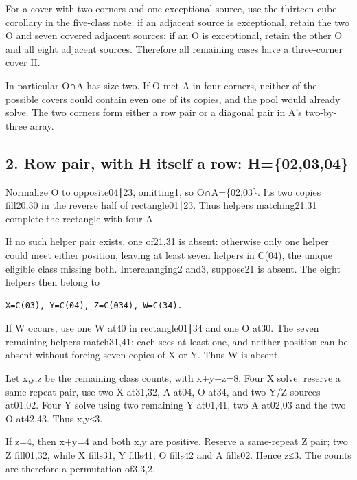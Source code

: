 \documentclass[
  10pt,
]{article}
\begin{document}
For a cover with two corners and one exceptional source, use the
thirteen-cube corollary in the five-class note: if an adjacent source is
exceptional, retain the two O and seven covered adjacent sources; if an
O is exceptional, retain the other O and all eight adjacent sources.
Therefore all remaining cases have a three-corner cover H.

In particular O∩A has size two. If O met A in four corners, neither of
the possible covers could contain even one of its copies, and the pool
would already solve. The two corners form either a row pair or a
diagonal pair in A's two-by-three array.

\hypertarget{row-pair-with-h-itself-a-row-h020304}{%
\subsection*{2. Row pair, with H itself a row:
H=\{02,03,04\}}\label{row-pair-with-h-itself-a-row-h020304}}

Normalize O to opposite04∣23, omitting1, so O∩A=\{02,03\}. Its two
copies fill20,30 in the reverse half of rectangle01∣23. Thus helpers
matching21,31 complete the rectangle with four A.

If no such helper pair exists, one of21,31 is absent: otherwise only one
helper could meet either position, leaving at least seven helpers in
C(04), the unique eligible class missing both. Interchanging2 and3,
suppose21 is absent. The eight helpers then belong to

\begin{verbatim}
X=C(03), Y=C(04), Z=C(034), W=C(34).
\end{verbatim}

If W occurs, use one W at40 in rectangle01∣34 and one O at30. The seven
remaining helpers match31,41: each sees at least one, and neither
position can be absent without forcing seven copies of X or Y. Thus W is
absent.

Let x,y,z be the remaining class counts, with x+y+z=8. Four X solve:
reserve a same-repeat pair, use two X at31,32, A at04, O at34, and two
Y/Z sources at01,02. Four Y solve using two remaining Y at01,41, two A
at02,03 and the two O at42,43. Thus x,y≤3.

If z=4, then x+y=4 and both x,y are positive. Reserve a same-repeat Z
pair; two Z fill01,32, while X fills31, Y fills41, O fills42 and A
fills02. Hence z≤3. The counts are therefore a permutation of3,3,2.
\end{document}
